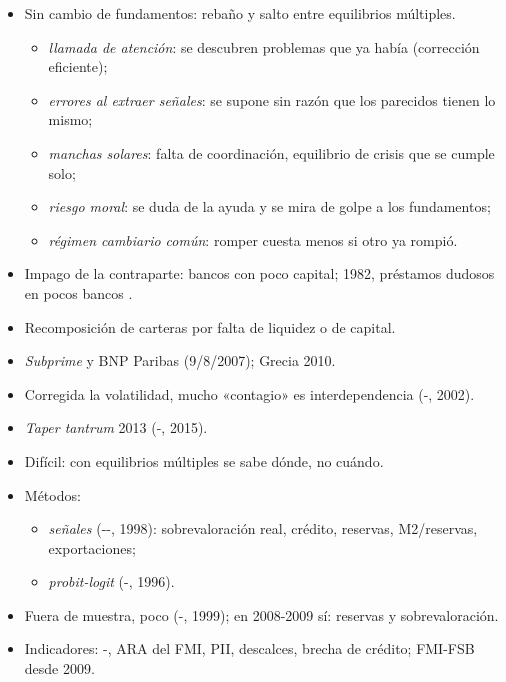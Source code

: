 \documentclass{article}
\begin{document}
\begin{columnas}
\begin{itemize}
\item Sin cambio de fundamentos: rebaño y salto entre equilibrios múltiples.
  \begin{itemize}
  \item \emph{llamada de atención}: se descubren problemas que ya había (corrección eficiente);
  \item \emph{errores al extraer señales}: se supone sin razón que los parecidos tienen lo mismo;
  \item \emph{manchas solares}: falta de coordinación, equilibrio de crisis que se cumple solo;
  \item \emph{riesgo moral}: se duda de la ayuda y se mira de golpe a los fundamentos;
  \item \emph{régimen cambiario común}: romper cuesta menos si otro ya rompió.
  \end{itemize}
\end{itemize}
\begin{itemize}
\item Impago de la contraparte: bancos con poco capital; 1982, préstamos dudosos en pocos bancos .
\item Recomposición de carteras por falta de liquidez o de capital.
\item \emph{Subprime} y BNP Paribas (9/8/2007); Grecia 2010.
\end{itemize}
\begin{itemize}
\item Corregida la volatilidad, mucho «contagio» es interdependencia (-, 2002).
\item \emph{Taper tantrum} 2013 (-, 2015).
\end{itemize}

\begin{itemize}
\item Difícil: con equilibrios múltiples se sabe dónde, no cuándo.
\item Métodos:
  \begin{itemize}
  \item \emph{señales} (--, 1998): sobrevaloración real, crédito, reservas, M2/reservas, exportaciones;
  \item \emph{probit-logit} (-, 1996).
  \end{itemize}
\item Fuera de muestra, poco (-, 1999); en 2008-2009 sí: reservas y sobrevaloración.
\item Indicadores: -, ARA del FMI, PII, descalces, brecha de crédito; FMI-FSB desde 2009.
\end{itemize}


\end{columnas}
\end{document}
